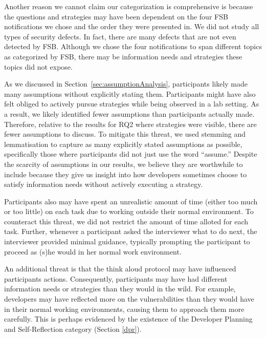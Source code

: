 \documentclass[10pt,journal,compsoc]{IEEEtran}
\begin{document}
Another reason we cannot claim our categorization is comprehensive is because the questions and strategies may have been dependent on the four FSB notifications we chose and the order they were presented in. 
We did not study all types of security defects. 
In fact, there are many defects that are not even detected by FSB.
Although we chose the four notifications to span different topics as categorized by FSB, there may be information needs and strategies these topics did not expose.

As we discussed in Section~\ref{sec:assumptionAnalysis}, participants likely made many assumptions without explicitly stating them.
Participants might have also felt obliged to actively pursue strategies while being observed in a lab setting.
As a result, we likely identified fewer assumptions than participants actually made.
Therefore, relative to the results for RQ2 where strategies were visible, there are fewer assumptions to discuss.
To mitigate this threat, we used stemming and lemmatisation to capture as many explicitly stated assumptions as possible, specifically those where participants did not just use the word ``assume.''
Despite the scarcity of assumptions in our results, we believe they are worthwhile to include because they give us insight into how developers sometimes choose to satisfy information needs without actively executing a strategy.

Participants also may have spent an unrealistic amount of time (either too much or too little) on each task due to working outside their normal environment.
To counteract this threat, we did not restrict the amount of time alloted for each task.
Further, whenever a participant asked the interviewer what to do next, the interviewer provided minimal guidance, typically prompting the participant to proceed as (s)he would in her normal work environment.


An additional threat is that the think aloud protocol may have influenced participants actions.
Consequently, participants may have had different information needs or strategies than they would in the wild.
For example, developers may have reflected more on the vulnerabilities than they would have in their normal working environments, causing them to approach them more carefully. 
This is perhaps evidenced by the existence of the Developer Planning and Self-Reflection category (Section \ref{dpr}).
\end{document}
